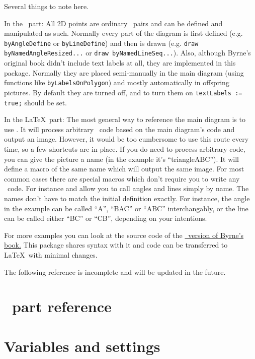 \documentclass{ltxdoc}
\begin{document}
\baselineskip

Several things to note here. 

In the \METAPOST\ part: 
All 2D points are ordinary \METAPOST\ pairs and can be defined and manipulated as such. Normally every part of the diagram is first defined (e.g. \texttt{byAngleDefine} or \texttt{byLineDefine}) and then is drawn (e.g. \texttt{draw byNamedAngleResized...} or \texttt{draw byNamedLineSeq...}). Also, although Byrne's original book didn't include text labels at all, they are implemented in this package. Normally they are placed semi-manually in the main diagram (using functions like \texttt{byLabelsOnPolygon}) and mostly automatically in offspring pictures. By default they are turned off, and to turn them on \texttt{textLabels := true;} should be set.

In the \LaTeX\ part: 
The most general way to reference the main diagram is to use . It will process arbitrary \METAPOST\ code based on the main diagram's code and output an image. However, it would be too cumbersome to use this route every time, so a few shortcuts are in place. If you do need to process arbitrary code, you can give the picture a name (in the example it's ``triangleABC''). It will define a macro of the same name  which will output the same image. For most common cases there are special macros which don't require you to write any \METAPOST\ code. For instance  and  allow you to call angles and lines simply by name. The names don't have to match the initial definition exactly. For instance, the angle in the example can be called ``A'', ``BAC'' or ``ABC'' interchangably, or the line can be called either ``BC'' or ``CB'', depending on your intentions.

For more examples you can look at the source code of the \href{https://github.com/jemmybutton/byrne-euclid/}{\ConTeXt\ version of Byrne's book.} This package shares syntax with it and code can be transferred to \LaTeX\ with minimal changes.

The following reference is incomplete and will be updated in the future.

\section{\METAPOST\ part reference}

\section{Variables and settings}
\end{document}
